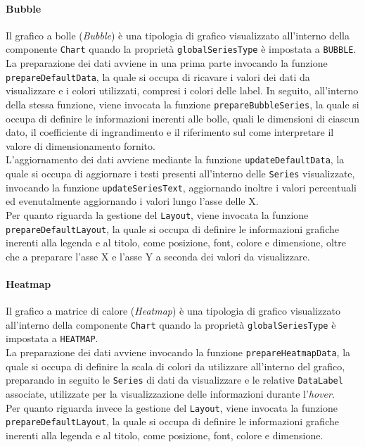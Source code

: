 \paragraph{Bubble}
Il grafico a bolle (\textit{Bubble}) è una tipologia di grafico visualizzato all'interno della componente \texttt{Chart} quando la proprietà \texttt{globalSeriesType} è impostata a \texttt{BUBBLE}. \\
La preparazione dei dati avviene in una prima parte invocando la funzione \\
\texttt{prepareDefaultData}, la quale si occupa di ricavare i valori dei dati da visualizzare e i colori utilizzati, compresi i
colori delle label. In seguito, all'interno della stessa funzione, viene invocata la funzione \texttt{prepareBubbleSeries}, la quale si occupa di definire le informazioni inerenti alle bolle, quali le
dimensioni di ciascun dato, il coefficiente di ingrandimento e il riferimento sul come interpretare il valore di dimensionamento fornito. \\
L'aggiornamento dei dati avviene mediante la funzione \texttt{updateDefaultData}, la quale si occupa di aggiornare i testi presenti all'interno delle \texttt{Series} visualizzate, invocando la funzione
\texttt{updateSeriesText}, aggiornando inoltre i valori percentuali ed evenutalmente aggiornando i valori lungo l'asse delle X. \\
Per quanto riguarda la gestione del \texttt{Layout}, viene invocata la funzione \\
\texttt{prepareDefaultLayout}, la quale si occupa di definire le informazioni grafiche inerenti alla legenda e al titolo, come posizione,
font, colore e dimensione, oltre che a preparare l'asse X e l'asse Y a seconda dei valori da visualizzare.

\paragraph{Heatmap}
Il grafico a matrice di calore (\textit{Heatmap}) è una tipologia di grafico visualizzato all'interno della componente \texttt{Chart} quando la proprietà \texttt{globalSeriesType} è impostata a \texttt{HEATMAP}. \\
La preparazione dei dati avviene invocando la funzione \texttt{prepareHeatmapData}, la quale si occupa di definire la scala di colori da utilizzare all'interno del grafico, preparando in seguito le \texttt{Series}
di dati da visualizzare e le relative \texttt{DataLabel} associate, utilizzate per la visualizzazione delle informazioni durante l'\textit{hover}. \\
Per quanto riguarda invece la gestione del \texttt{Layout}, viene invocata la funzione \\
\texttt{prepareDefaultLayout}, la quale si occupa di definire le informazioni grafiche inerenti alla legenda e al titolo,
come posizione, font, colore e dimensione.

